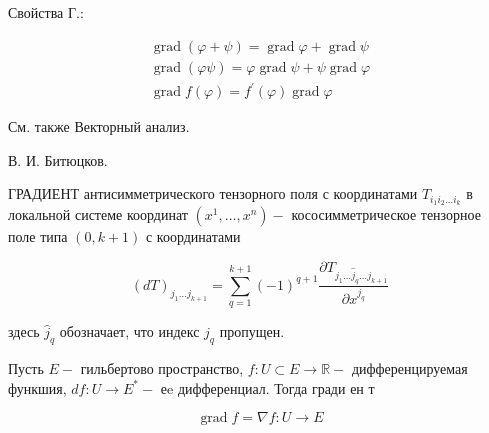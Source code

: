 \documentclass[10pt]{article}
\begin{document}
Свойства Г.:



\[

\begin{gathered}

\operatorname{grad}(\varphi+\psi)=\operatorname{grad} \varphi+\operatorname{grad} \psi \\

\operatorname{grad}(\varphi \psi)=\varphi \operatorname{grad} \psi+\psi \operatorname{grad} \varphi \\

\operatorname{grad} f(\varphi)=f^{\prime}(\varphi) \operatorname{grad} \varphi

\end{gathered}

\]



См. также Векторный анализ.



В. И. Битюцков.



ГРАДИЕНТ антисимметрического тензорного поля с координатами $T_{i_{1} i_{2} \ldots i_{k}}$ в локальной системе координат $\left(x^{1}, \ldots, x^{n}\right)-$ кососимметрическое тензорное поле типа $(0, k+1)$ с координатами



\[

(d T)_{j_{1} \ldots j_{k+1}}=\sum_{q=1}^{k+1}(-1)^{q+1} \frac{\partial T_{j_{1} \ldots \hat{j}_{q} \ldots j_{k+1}}}{\partial x^{j_{q}}}

\]



здесь $\hat{j}_{q}$ обозначает, что индекс $j_{q}$ пропущен.



Пусть $E-$ гильбертово пространство, $f: U \subset E \rightarrow \mathbb{R}-$ дифференцируемая функшия, $d f: U \rightarrow E^{*}-$ еe дифференциал. Тогда гради ен т



\[

\operatorname{grad} f=\nabla f: U \rightarrow E

\]
\end{document}

